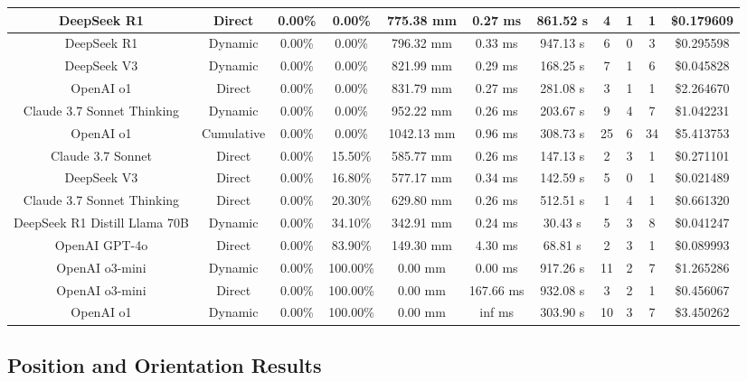 \begin{landscape}
\begin{table}[H]
\begin{center}
\begin{tabular}{|c|c|c|c|c|c|c|c|c|c|c|}
    \hline
    DeepSeek R1 & Direct & 0.00\% & 0.00\% & 775.38 mm & 0.27 ms & 861.52 s & 4 & 1 & 1 & \$0.179609 \\
    \hline
    DeepSeek R1 & Dynamic & 0.00\% & 0.00\% & 796.32 mm & 0.33 ms & 947.13 s & 6 & 0 & 3 & \$0.295598 \\
    \hline
    DeepSeek V3 & Dynamic & 0.00\% & 0.00\% & 821.99 mm & 0.29 ms & 168.25 s & 7 & 1 & 6 & \$0.045828 \\
    \hline
    OpenAI o1 & Direct & 0.00\% & 0.00\% & 831.79 mm & 0.27 ms & 281.08 s & 3 & 1 & 1 & \$2.264670 \\
    \hline
    Claude 3.7 Sonnet Thinking & Dynamic & 0.00\% & 0.00\% & 952.22 mm & 0.26 ms & 203.67 s & 9 & 4 & 7 & \$1.042231 \\
    \hline
    OpenAI o1 & Cumulative & 0.00\% & 0.00\% & 1042.13 mm & 0.96 ms & 308.73 s & 25 & 6 & 34 & \$5.413753 \\
    \hline
    Claude 3.7 Sonnet & Direct & 0.00\% & 15.50\% & 585.77 mm & 0.26 ms & 147.13 s & 2 & 3 & 1 & \$0.271101 \\
    \hline
    DeepSeek V3 & Direct & 0.00\% & 16.80\% & 577.17 mm & 0.34 ms & 142.59 s & 5 & 0 & 1 & \$0.021489 \\
    \hline
    Claude 3.7 Sonnet Thinking & Direct & 0.00\% & 20.30\% & 629.80 mm & 0.26 ms & 512.51 s & 1 & 4 & 1 & \$0.661320 \\
    \hline
    DeepSeek R1 Distill Llama 70B & Dynamic & 0.00\% & 34.10\% & 342.91 mm & 0.24 ms & 30.43 s & 5 & 3 & 8 & \$0.041247 \\
    \hline
    OpenAI GPT-4o & Direct & 0.00\% & 83.90\% & 149.30 mm & 4.30 ms & 68.81 s & 2 & 3 & 1 & \$0.089993 \\
    \hline
    OpenAI o3-mini & Dynamic & 0.00\% & 100.00\% & 0.00 mm & 0.00 ms & 917.26 s & 11 & 2 & 7 & \$1.265286 \\
    \hline
    OpenAI o3-mini & Direct & 0.00\% & 100.00\% & 0.00 mm & 167.66 ms & 932.08 s & 3 & 2 & 1 & \$0.456067 \\
    \hline
    OpenAI o1 & Dynamic & 0.00\% & 100.00\% & 0.00 mm & inf ms & 303.90 s & 10 & 3 & 7 & \$3.450262 \\
    \hline
\end{tabular}
\label{Results-Position-1-6}
\end{center}
\end{table}

\subsection{Position and Orientation Results}


\end{landscape}
